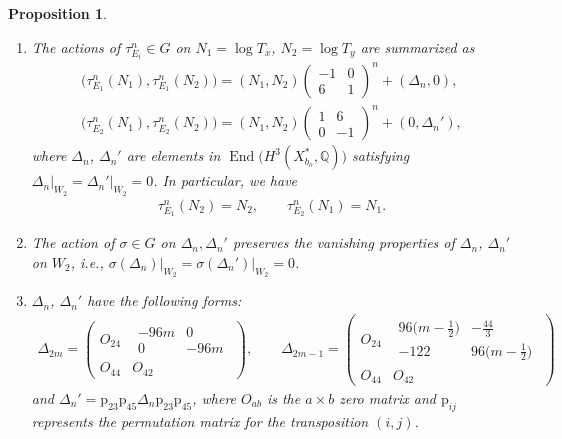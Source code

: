 \documentclass[10pt,a4paper]{amsart}
\numberwithin{equation}{section}
\newtheorem{Proposition}[Theorem]{Proposition}
\begin{document}
\begin{Proposition}\label{prop:tau1-tau2-actions}\quad
\begin{enumerate}\itemsep=0pt
\item[{\rm (1)}] The actions of $\tau_{E_{i}}^{n}\in G$ on $N_{1}=\log T_{x}$, $N_{2}=\log T_{y}$ are summarized as
\begin{gather*}
\big(\tau_{E_{1}}^{n}(N_{1}),\tau_{E_{1}}^{n}(N_{2})\big)=(N_{1},N_{2})\left(\begin{matrix}-1 & 0\\
6 & 1
\end{matrix}\right)^{n}+(\Delta_{n},0),\\
\big(\tau_{E_{2}}^{n}(N_{1}),\tau_{E_{2}}^{n}(N_{2})\big)=(N_{1},N_{2})\left(\begin{matrix}1 & 6\\
0 & -1 \end{matrix}\right)^{n}+(0,\Delta_{n}'),
\end{gather*}
where $\Delta_{n}$, $\Delta_{n}'$ are elements in $\operatorname{End}\big(H^{3}(X_{b_{o}}^{*},\mathbb{Q})\big)$ satisfying $\Delta_{n}\vert_{W_{2}}=\Delta_{n}'\vert_{W_{2}}=0$. In particular, we have
\begin{gather*}
\tau_{E_{1}}^{n}(N_{2})=N_{2},\qquad \tau_{E_{2}}^{n}(N_{1})=N_{1}.
\end{gather*}

\item[{\rm (2)}] The action of $\sigma\in G$ on $\Delta_{n},\Delta_{n}'$ preserves the vanishing properties of $\Delta_{n}$, $\Delta_{n}'$ on
$W_{2}$, i.e., $\sigma(\Delta_{n})\vert_{W_{2}}=\sigma(\Delta_{n}')\vert_{W_{2}}=0$.

\item[{\rm (3)}] $\Delta_{n}$, $\Delta_{n}'$ have the following forms:
\begin{gather*}
\Delta_{2m}=\left(\begin{matrix}
O_{24} & \begin{smallmatrix}-96m & 0\\
0 & -96m
\end{smallmatrix}\\
O_{44} & O_{42}
\end{matrix}\right),\qquad \Delta_{2m-1}=\left(\begin{matrix}
O_{24} & \begin{smallmatrix}96\big(m-\frac{1}{2}\big) & -\frac{44}{3}\\
-122 & 96\big(m-\frac{1}{2}\big)
\end{smallmatrix}\\
O_{44} & O_{42}
\end{matrix}\right)
\end{gather*}
and $\Delta_{n}'=\mathrm{p}_{23}\mathrm{p}_{45}\Delta_{n}\mathrm{p}_{23}\mathrm{p}_{45}$, where $O_{ab}$ is the $a\times b$ zero matrix and $\mathrm{p}_{ij}$ represents the permutation matrix for the transposition $(i,j)$.
\end{enumerate}\end{Proposition}
\end{document}
